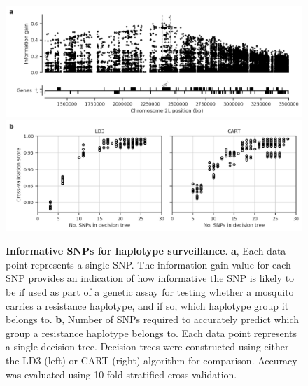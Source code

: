 \documentclass[a4paper,11pt,abstracton,hidelinks]{scrartcl}
\begin{document}
%
\begin{figure}[!t]
  \centering

  \includegraphics[width=1.0\linewidth]{artwork/info_gain.png}
  \includegraphics[width=1.0\linewidth]{artwork/tree_cv.png}

  \caption{%
%
\textbf{Informative SNPs for haplotype surveillance}.
%
\textbf{a}, Each data point represents a single SNP.
%
The information gain value for each SNP provides an indication of how informative the SNP is likely to be if used as part of a genetic assay for testing whether a mosquito carries a resistance haplotype, and if so, which haplotype group it belongs to.
%
\textbf{b}, Number of SNPs required to accurately predict which group a resistance haplotype belongs to.
%
Each data point represents a single decision tree.
%
Decision trees were constructed using either the LD3 (left) or CART (right) algorithm for comparison.
%
Accuracy was evaluated using 10-fold stratified cross-validation.
}

  \label{fig:gain}
\end{figure}
\end{document}
